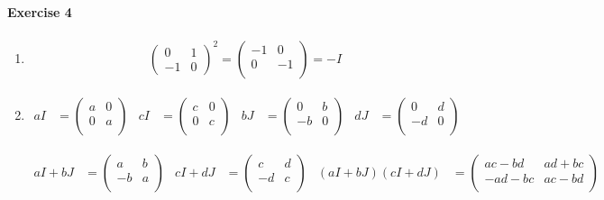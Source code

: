 \documentclass{article}
\begin{document}
\paragraph{Exercise 4}

\begin{enumerate}
    \item \begin{align*}
        \begin{pmatrix}
            0 & 1 \\ -1 & 0
        \end{pmatrix}^2 = \begin{pmatrix}
            -1 & 0 \\
            0 & -1 \\
        \end{pmatrix} = -I
    \end{align*}

    \item \begin{align*}
        aI &= \begin{pmatrix}
            a & 0 \\ 0 & a \\
        \end{pmatrix} &
        cI &= \begin{pmatrix}
            c & 0 \\ 0 & c \\
        \end{pmatrix} &
        bJ &= \begin{pmatrix}
            0 & b \\ -b & 0 \\
        \end{pmatrix} &
        dJ &= \begin{pmatrix}
            0 & d \\ -d & 0 \\
        \end{pmatrix} 
    \end{align*}

    \begin{align*}
        aI + bJ &= \begin{pmatrix}
            a & b \\ -b & a \\
        \end{pmatrix} &
        cI + dJ &= \begin{pmatrix}
            c & d \\ -d & c \\
        \end{pmatrix} & 
        (aI + bJ)(cI + dJ) &= \begin{pmatrix}
            ac - bd & ad + bc \\
            -ad - bc & ac - bd \\
        \end{pmatrix}
    \end{align*}


\end{enumerate}
\end{document}
